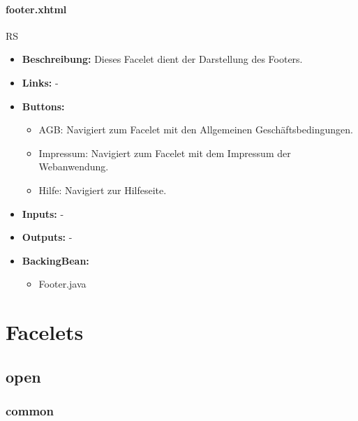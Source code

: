 		\paragraph{footer.xhtml}
			RS\\
			\begin{itemize}
				\item \textbf{Beschreibung:} Dieses Facelet dient der Darstellung des Footers.
				\item \textbf{Links:} -
				\item \textbf{Buttons:}
					\begin{itemize}
						\item AGB: Navigiert zum Facelet mit den Allgemeinen Geschäftsbedingungen.
						\item Impressum: Navigiert zum Facelet mit dem Impressum der Webanwendung.
						\item Hilfe: Navigiert zur Hilfeseite.
					\end{itemize}
				\item \textbf{Inputs:} -
				\item \textbf{Outputs:} -
				\item \textbf{BackingBean:}
					\begin{itemize}
						\item Footer.java
					\end{itemize}
			\end{itemize}
	
	\section{Facelets}
	
		\subsection{open}
			
			\subsubsection{common}
			
